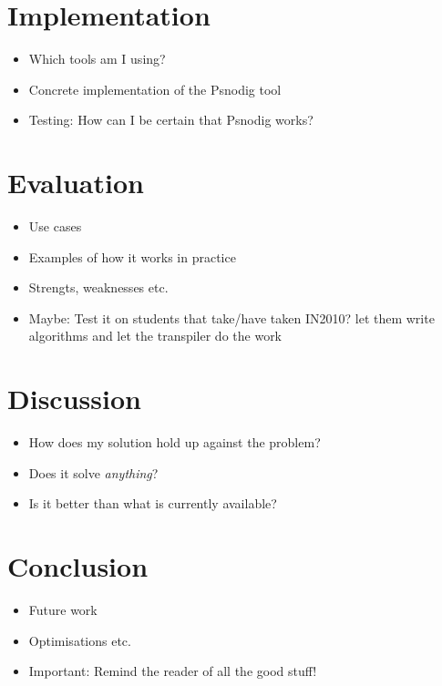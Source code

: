 \documentclass{article}
\begin{document}

\section{Implementation}
\begin{itemize}
    \item Which tools am I using?
    \item Concrete implementation of the Psnodig tool
    \item Testing: How can I be certain that Psnodig works?
\end{itemize}

\section{Evaluation}
\begin{itemize}
    \item Use cases
    \item Examples of how it works in practice
    \item Strengts, weaknesses etc.
    \item Maybe: Test it on students that take/have taken IN2010? let them write algorithms and let the transpiler do the work
\end{itemize}

\section{Discussion}
\begin{itemize}
    \item How does my solution hold up against the problem?
    \item Does it solve \textit{anything}?
    \item Is it better than what is currently available?
\end{itemize}

\section{Conclusion}
\begin{itemize}
    \item Future work
    \item Optimisations etc.
    \item Important: Remind the reader of all the good stuff!
\end{itemize}


\printbibliography
\end{document}
